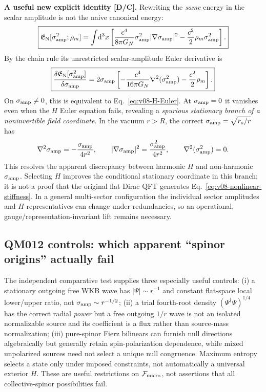 \documentclass[11pt,a4paper]{article}
\begin{document}
\textbf{A useful new explicit identity [D/C].} Rewriting the \emph{same} energy in the scalar amplitude is not the naive canonical energy:
\begin{equation}\label{eq:v08-nonlinear-stiffness}
\boxed{\mathfrak E_{\rm N}[\sigma_{\rm amp}^2;\rho_m]
=\int\!\mathrm d^3x\left[\frac{c^4}{8\pi G_N}\sigma_{\rm amp}^2|\nabla\sigma_{\rm amp}|^2
-\frac{c^2}{2}\rho_m\sigma_{\rm amp}^2\right].}
\end{equation}
By the chain rule its unrestricted scalar-amplitude Euler derivative is
\begin{equation}\label{eq:v08-zero-degeneracy}
\boxed{\frac{\delta\mathfrak E_{\rm N}[\sigma_{\rm amp}^2]}{\delta\sigma_{\rm amp}}
=2\sigma_{\rm amp}\left[-\frac{c^4}{16\pi G_N}\nabla^2(\sigma_{\rm amp}^2)-\frac{c^2}{2}\rho_m\right].}
\end{equation}
On $\sigma_{\rm amp}\ne0$, this is equivalent to Eq.~\eqref{eq:v08-H-Euler}. At $\sigma_{\rm amp}=0$ it vanishes even when the $H$ Euler equation fails, revealing a \emph{spurious stationary branch of a noninvertible field coordinate}. In the vacuum $r>R$, the correct $\sigma_{\rm amp}=\sqrt{r_s/r}$ has
\begin{equation}\label{eq:v08-sigma-radial-identity}
\nabla^2\sigma_{\rm amp}=-\frac{\sigma_{\rm amp}}{4r^2},\qquad
|\nabla\sigma_{\rm amp}|^2=\frac{\sigma_{\rm amp}^2}{4r^2},\qquad
\nabla^2(\sigma_{\rm amp}^2)=0.
\end{equation}
This resolves the apparent discrepancy between harmonic $H$ and non-harmonic $\sigma_{\rm amp}$. Selecting $H$ improves the conditional stationary coordinate in this branch; it is not a proof that the original flat Dirac QFT generates Eq.~\eqref{eq:v08-nonlinear-stiffness}. In a general multi-sector configuration the individual sector amplitudes and $H$ representatives can change under redundancies, so an operational, gauge/representation-invariant lift remains necessary.

\subsection{QM012 controls: which apparent ``spinor origins'' actually fail}\label{sec:v08-qm012-controls}
The independent comparative test supplies three especially useful controls: (i) a stationary outgoing free WKB wave has $|\Psi|\sim r^{-1}$ and constant flat-space local lower/upper ratio, not $\sigma_{\rm amp}\sim r^{-1/2}$; (ii) a trial fourth-root density $(\Psi^\dagger\Psi)^{1/4}$ has the correct radial \emph{power} but a free outgoing $1/r$ wave is not an isolated normalizable source and its coefficient is a flux rather than source-mass normalization; (iii) pure-spinor Fierz bilinears can furnish null directions algebraically but generally retain spin-polarization dependence, while mixed unpolarized sources need not select a unique null congruence. Maximum entropy selects a state only under imposed constraints, not automatically a universal exterior $H$. These are useful restrictions on $\mathcal F_{\rm micro}$, not assertions that all collective-spinor possibilities fail.
\end{document}
